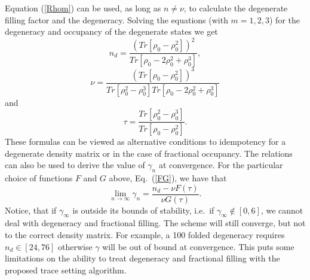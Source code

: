 \commentoutA{\documentclass[prb,aps,twocolumn,twocolumngrid,secnumarabic,superbib,hyperref]{revtex4}}
\begin{document}
Equation (\ref{Rhom}) can be used, as long as
$n \neq \nu$, to calculate the degenerate filling factor and the degeneracy.
Solving the equations (with $m=1,2,3$) for the degeneracy and occupancy
of the degenerate states we get
\begin{equation}
n_d = \frac{(Tr [\rho_0-\rho_0^2 ])^2}{Tr [\rho_0-2\rho_0^2+\rho_0^3 ]},
\end{equation}
\begin{equation}
\nu = \frac{(Tr [\rho_0-\rho_0^2 ])^3}{Tr [\rho_0^2-\rho_0^3 ]Tr [\rho_0-2\rho_0^2+\rho_0^3 ]}
\end{equation}
and
\begin{equation}
\tau = \frac{Tr [\rho_0^2-\rho_0^3 ]}{Tr [\rho_0-\rho_0^2 ]}.
\end{equation}
These formulas can be viewed as alternative conditions to idempotency
for a degenerate density matrix or in the case of fractional occupancy. 
The relations can also be used
to derive the value of $\gamma_n$ at convergence. For the particular
choice of functions $F$ and $G$ above, Eq.\ (\ref{FG}), we have that
\begin{equation}
\lim_{n \rightarrow \infty} \gamma_n = \frac{n_d - \nu F(\tau )}
                                               {\nu G(\tau )}.
\end{equation}
Notice, that if $\gamma_{\infty}$
is outside its bounds of stability, i.e.\ if $\gamma_{\infty} \notin [0,6]$, we cannot deal with
degeneracy and fractional filling. The scheme will still
converge, but not to the correct density matrix. For example,
a 100 folded degeneracy requires $n_d \in [24,76]$ otherwise
$\gamma$ will be out of bound at convergence. This puts some
limitations on the ability to treat degeneracy and fractional filling
with the proposed trace setting algorithm.




\end{document}
